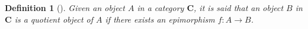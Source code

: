 \documentclass[sn-mathphys-num]{sn-jnl}%
\theoremstyle{thmstyleone}%
\newtheorem{proposition}[theorem]{Proposition}%
\theoremstyle{thmstyletwo}%
\theoremstyle{thmstylethree}%
\newtheorem{definition}{Definition}%
\begin{document}
\begin{definition}[\cite{Adamek}]
Given an object $A$ in a category $\mathbf{C}$, it is said that an object $B$ in $\mathbf{C}$ is a quotient object of $A$ if there exists an epimorphism $f: A \to B $. \\  
\end{definition}
\end{document}
